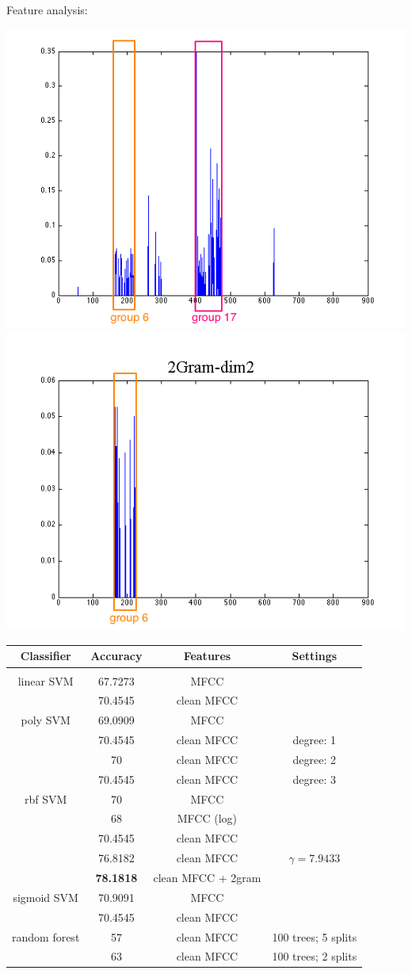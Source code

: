 
Feature analysis:

\includegraphics[width=0.18 \linewidth]{./images/mfcc_180.png}
\includegraphics[width=0.20 \linewidth]{./images/ngram_202.png}

\footnotesize
\begin{tabular}{cccc}
\multicolumn{1}{c}{\bf Classifier }&\multicolumn{1}{c}{\bf Accuracy}  &\multicolumn{1}{c}{\bf Features} &\multicolumn{1}{c}{\bf Settings}
\\ \hline \\
linear SVM		&67.7273 		&MFCC 		&  \\
			& 70.4545  	& clean MFCC 	&  \\
poly SVM		&69.0909		&MFCC 		&  \\
			& 70.4545  	& clean MFCC 	& degree: 1  \\
			& 70 			& clean MFCC 	& degree: 2  \\
			& 70.4545  	& clean MFCC 	& degree: 3  \\
rbf SVM       	&70 			&MFCC 		&  \\
                     	&68  			&  MFCC (log) 	&  \\
          		&70.4545  		&  clean MFCC 	&  \\
          		&76.8182  		&  clean MFCC 	&  $\gamma = 7.9433$ \\
          		&{\bf 78.1818}  	&  clean MFCC + 2gram 	&    \\
sigmoid SVM     	&70.9091		&MFCC 		&  \\
       			&70.4545  		& clean MFCC 	&  \\
random forest    	&57			& clean MFCC	& 100 trees; 5 splits \\
       			&63  			& clean MFCC 	& 100 trees; 2 splits \\

\end{tabular}


